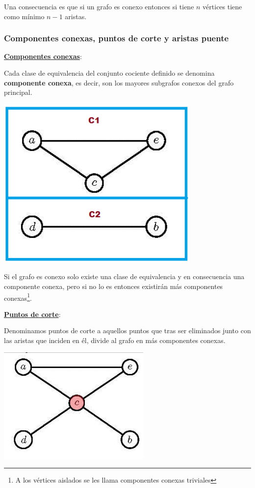 \documentclass[10pt,a4paper,openright]{book}
\begin{document}
Una consecuencia es que si un grafo es conexo entonces si tiene $n$ vértices tiene como mínimo $n-1$ aristas.
 
\subsubsection*{Componentes conexas, puntos de corte y aristas puente}
\underline{\textbf{Componentes conexas}}:

Cada clase de equivalencia del conjunto cociente definido se denomina \textbf{componente conexa}, es decir, son los mayores subgrafos conexos del grafo principal.

\begin{center}
\includegraphics[scale=0.65]{componentes conexas}
\end{center}

Si el grafo es conexo solo existe una clase de equivalencia y en consecuencia una componente conexa, pero si no lo es entonces existirán más componentes conexas\footnote{A los vértices aislados se les llama componentes conexas triviales}.

\underline{\textbf{Puntos de corte}}:

Denominamos puntos de corte a aquellos puntos que tras ser eliminados junto con las aristas que inciden en él, divide al grafo en más componentes conexas.
\begin{center}
\includegraphics[scale=0.55]{punto de corte}
\end{center}
\end{document}
